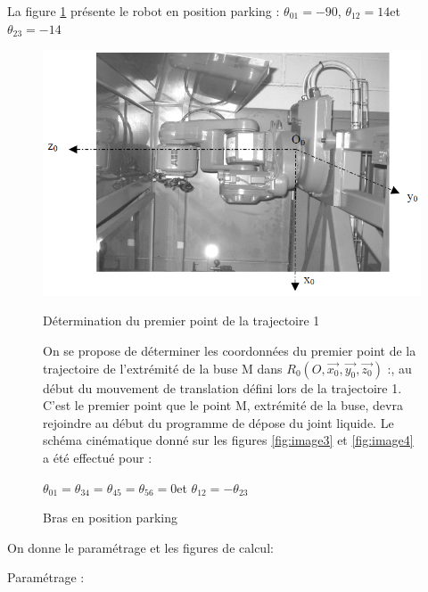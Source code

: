 \newpage

La figure \ref{fig:image5} présente le robot en position \og parking \fg :
$\theta_{01}=-90$\textdegree, $\theta_{12}=14$\textdegree et $\theta_{23}=-14$\textdegree


\begin{figure}[htbp]
\begin{minipage}[c]{.4\linewidth}
\begin{center}
\includegraphics[width=\linewidth]{img/Image1.png}
\caption{Bras en position parking}
\label{fig:image5}
\end{center}
\end{minipage}
\hfill
\begin{minipage}[c]{.55\linewidth}
Détermination du premier point de la trajectoire 1

On se propose de déterminer les coordonnées du premier point de la trajectoire de l'extrémité de la buse M dans $R_0(O,\overrightarrow{x_0},\overrightarrow{y_0},\overrightarrow{z_0})$ :, au début du mouvement de translation défini lors de la trajectoire 1. C'est le premier point que le point M, extrémité de la buse, devra rejoindre au début du programme de dépose du joint liquide.
Le schéma cinématique donné sur les figures \ref{fig:image3} et \ref{fig:image4} a été effectué pour :

$\theta_{01}=\theta_{34}=\theta_{45}=\theta_{56}=0$\textdegree et $\theta_{12}=-\theta_{23}$ 
\end{minipage}
\end{figure}

On donne le paramétrage et les figures de calcul:

Paramétrage :

